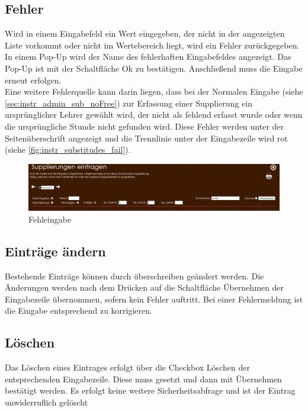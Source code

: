 \subsection{Fehler}
Wird in einem Eingabefeld ein Wert eingegeben, der nicht in der angezeigten Liste vorkommt oder nicht im Wertebereich liegt, wird ein Fehler zurückgegeben. In einem Pop-Up wird der Name des fehlerhaften Eingabefeldes angezeigt. Das Pop-Up ist mit der Schaltfläche Ok zu bestätigen. Anschließend muss die Eingabe erneut erfolgen.\\
Eine weitere Fehlerquelle kann darin liegen, dass bei der Normalen Eingabe (siehe \autoref{sec:instr_admin_sub_noFree}) zur Erfassung einer Supplierung ein ursprünglicher Lehrer gewählt wird, der nicht als fehlend erfasst wurde oder wenn die ursprüngliche Stunde nicht gefunden wird. Diese Fehler werden unter der Seitenüberschrift angezeigt und die Trennlinie unter der Eingabezeile wird rot (siehe \autoref{fig:instr_substitudes_fail}).
\begin{figure}[H]
\centering
\includegraphics[keepaspectratio=true, width=17cm]{images/screenshots/substitudes_fail.png}
\caption{Fehleingabe}
\label{fig:instr_substitudes_fail}
\end{figure}
\subsection{Einträge ändern}
Bestehende Einträge können durch überschreiben geändert werden. Die Änderungen werden nach dem Drücken auf die Schaltfläche Übernehmen der Eingabezeile übernommen, sofern kein Fehler auftritt. Bei einer Fehlermeldung ist die Eingabe entsprechend zu korrigieren.
\subsection{Löschen}
Das Löschen eines Eintrages erfolgt über die Checkbox Löschen der entsprechenden Eingabezeile. Diese muss gesetzt und dann mit Übernehmen bestätigt werden. Es erfolgt keine weitere Sicherheitsabfrage und ist der Eintrag unwiderruflich gelöscht